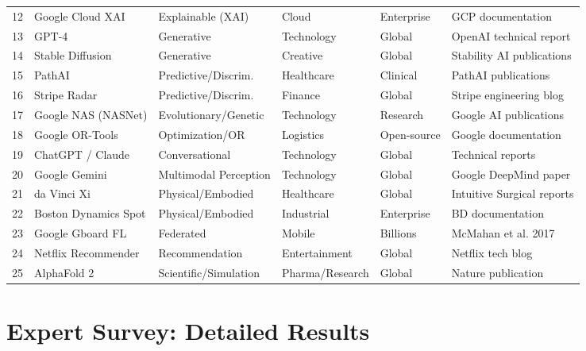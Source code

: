 \documentclass[acmlarge]{acmart}
\begin{document}
\begin{table}[ht]
\begin{tabular}{@{}rllllp{3cm}@{}}
12 & Google Cloud XAI   & Explainable (XAI)       & Cloud           & Enterprise & GCP documentation \\
13 & GPT-4              & Generative              & Technology      & Global   & OpenAI technical report \\
14 & Stable Diffusion   & Generative              & Creative        & Global   & Stability AI publications \\
15 & PathAI             & Predictive/Discrim.     & Healthcare      & Clinical & PathAI publications \\
16 & Stripe Radar       & Predictive/Discrim.     & Finance         & Global   & Stripe engineering blog \\
17 & Google NAS (NASNet) & Evolutionary/Genetic   & Technology      & Research & Google AI publications \\
18 & Google OR-Tools    & Optimization/OR         & Logistics       & Open-source & Google documentation \\
19 & ChatGPT / Claude   & Conversational          & Technology      & Global   & Technical reports \\
20 & Google Gemini      & Multimodal Perception   & Technology      & Global   & Google DeepMind paper \\
21 & da Vinci Xi        & Physical/Embodied       & Healthcare      & Global   & Intuitive Surgical reports \\
22 & Boston Dynamics Spot & Physical/Embodied     & Industrial      & Enterprise & BD documentation \\
23 & Google Gboard FL   & Federated               & Mobile          & Billions & McMahan et al. 2017 \\
24 & Netflix Recommender & Recommendation         & Entertainment   & Global   & Netflix tech blog \\
25 & AlphaFold 2        & Scientific/Simulation   & Pharma/Research & Global   & Nature publication \\
\bottomrule
\end{tabular}
\end{table}


\section{Expert Survey: Detailed Results}
\label{app:survey-results}
\end{document}
